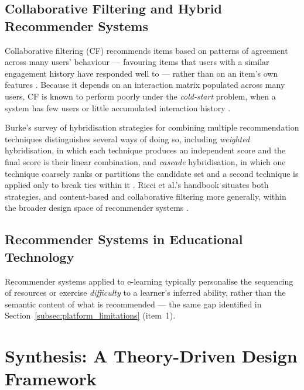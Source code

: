     \subsection{Collaborative Filtering and Hybrid Recommender Systems}
    \label{subsec:cascade_hybrid}
    Collaborative filtering (CF) recommends items based on patterns of agreement across many users' behaviour --- favouring items that users with a similar engagement history have responded well to --- rather than on an item's own features \cite{adomavicius2005toward}. Because it depends on an interaction matrix populated across many users, CF is known to perform poorly under the \emph{cold-start} problem, when a system has few users or little accumulated interaction history \cite{adomavicius2005toward}.

    Burke's survey of hybridisation strategies for combining multiple recommendation techniques distinguishes several ways of doing so, including \emph{weighted} hybridisation, in which each technique produces an independent score and the final score is their linear combination, and \emph{cascade} hybridisation, in which one technique coarsely ranks or partitions the candidate set and a second technique is applied only to break ties within it \cite{burke2002hybrid}. Ricci et al.'s handbook situates both strategies, and content-based and collaborative filtering more generally, within the broader design space of recommender systems \cite{ricci2011introduction}.

    \subsection{Recommender Systems in Educational Technology}
    \label{subsec:edtech_recommenders}
    Recommender systems applied to e-learning typically personalise the sequencing of resources or exercise \emph{difficulty} to a learner's inferred ability, rather than the semantic content of what is recommended \cite{klasnja2011elearning} --- the same gap identified in Section~\ref{subsec:platform_limitations} (item~1).


\section{Synthesis: A Theory-Driven Design Framework}
\label{sec:synthesis}

